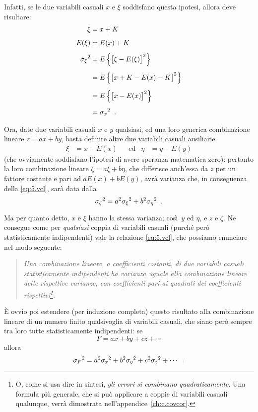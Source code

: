 Infatti, se le due variabili casuali $x$ e $\xi$ soddisfano
questa ipotesi, allora deve risultare:
\begin{align*}
  \xi &= x + K \\[1ex]
  E(\xi) &= E(x) + K \\[1ex]
  {\sigma_\xi}^2 &=
    E \left \{ \bigl[ \xi - E(\xi) \bigr] ^2
    \right \} \\[1ex]
  &= E \left \{ \bigl[ x + K - E(x) - K
    \bigr] ^2 \right \} \\[1ex]
  &= E \left \{ \bigl[ x - E(x) \bigr] ^2
    \right \} \\[1ex]
  &= {\sigma_x}^2 \;\; .
\end{align*}

Ora, date due variabili casuali $x$ e $y$ qualsiasi, ed una
loro generica combinazione lineare $z = a x + b y$, basta
definire altre due variabili casuali ausiliarie
\begin{align*}
  \xi &= x - E(x) & &\text{ed} &
  \eta &= y - E(y)
\end{align*}
(che ovviamente soddisfano l'ipotesi di avere speranza
matematica zero): pertanto la loro combinazione lineare $
\zeta = a \xi + b \eta $, che differisce anch'essa da $z$
per un fattore costante e pari ad $a E(x) + b E(y)$, avr\`a
varianza che, in conseguenza della \eqref{eq:5.vcl}, sar\`a
data dalla
\begin{equation*}
  {\sigma_\zeta}^2 = a^2 {\sigma_\xi}^2 + b^2
  {\sigma_\eta}^2 \;\; .
\end{equation*}

Ma per quanto detto, $x$ e $\xi$ hanno la stessa varianza;
cos\`\i\ $y$ ed $\eta$, e $z$ e $\zeta$.  Ne consegue come
per \emph{qualsiasi} coppia di variabili casuali (purch\'e
per\`o statisticamente indipendenti) vale la relazione
\eqref{eq:5.vcl}, che possiamo enunciare nel modo seguente:
\begin{quote}
  \textit{Una combinazione lineare, a coefficienti costanti,
    di due variabili casuali statisticamente indipendenti ha
    varianza uguale alla combinazione lineare delle
    rispettive varianze, con coefficienti pari ai quadrati
    dei coefficienti rispettivi\thinspace\/\footnote{O, come
      si usa dire in sintesi, \emph{gli errori si combinano
        quadraticamente}.  Una formula pi\`u generale, che
      si pu\`o applicare a coppie di variabili casuali
      qualunque, verr\`a dimostrata
      nell'appendice~\ref{ch:c.covcor}.}.}
\end{quote}

\`E ovvio poi estendere (per induzione completa) questo
risultato alla combinazione lineare di un numero finito
qualsivoglia di variabili casuali, che siano per\`o sempre
tra loro tutte statisticamente indipendenti: se
\begin{equation*}
  F = ax + by + cz +\cdots
\end{equation*}
allora
\begin{equation} \label{eq:5.varcol}
  {\sigma_F}^2 = a^2 {\sigma_x}^2 + b^2 {\sigma_y}^2 +
  c^2 {\sigma_z}^2 +\cdots \;\; .
\end{equation}%
%

